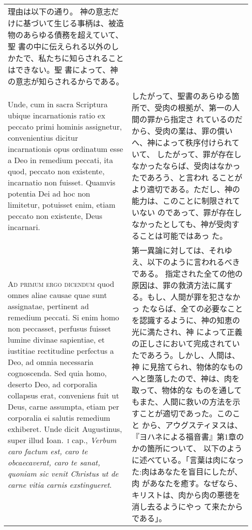 \documentclass[10pt]{jsarticle} %
\begin{document}
\begin{longtable}{p{21em}p{21em}}
理由は以下の通り。
神の意志だけに基づいて生じる事柄は、被造物のあらゆる債務を超えていて、聖
 書の中に伝えられる以外のしかたで、私たちに知らされることはできない。聖
 書によって、神の意志が知らされるからである。


\\

Unde, cum in sacra Scriptura ubique
incarnationis ratio ex peccato primi hominis assignetur, convenientius
dicitur incarnationis opus ordinatum esse a Deo in remedium peccati, ita
quod, peccato non existente, incarnatio non fuisset. Quamvis potentia
Dei ad hoc non limitetur, potuisset enim, etiam peccato non existente,
Deus incarnari.


&

したがって、聖書のあらゆる箇所で、受肉の根拠が、第一の人間の罪から指定さ
 れているのだから、受肉の業は、罪の償いへ、神によって秩序付けられていて、
 したがって、罪が存在しなかったならば、受肉はなかったであろう、と言われ
 ることがより適切である。ただし、神の能力は、このことに制限されていない
 のであって、罪が存在しなかったとしても、神が受肉することは可能ではあっ
 た。


\\


{\scshape Ad primum ergo dicendum} quod omnes aliae
causae quae sunt assignatae, pertinent ad remedium peccati. Si enim homo
non peccasset, perfusus fuisset lumine divinae sapientiae, et iustitiae
rectitudine perfectus a Deo, ad omnia necessaria cognoscenda. Sed quia
homo, deserto Deo, ad corporalia collapsus erat, conveniens fuit ut
Deus, carne assumpta, etiam per corporalia ei salutis remedium
exhiberet. Unde dicit Augustinus, super illud Ioan.~{\scshape i} cap., {\itshape Verbum caro
factum est, caro te obcaecaverat, caro te sanat, quoniam sic venit
Christus ut de carne vitia carnis exstingueret}.


&

第一異論に対しては、それゆえ、以下のように言われるべきである。
指定された全ての他の原因は、罪の救済方法に属する。もし、人間が罪を犯さなかっ
 たならば、全ての必要なことを認識するように、神の知恵の光に満たされ、神
 によって正義の正しさにおいて完成されていたであろう。しかし、人間は、神
 に見捨てられ、物体的なものへと堕落したので、神は、肉を取って、物体的な
 ものを通してもまた、人間に救いの方法を示すことが適切であった。このこと
 から、アウグスティヌスは、『ヨハネによる福音書』第1章のかの箇所について、
 以下のように述べている。「言葉は肉になった:肉はあなたを盲目にしたが、肉
 があなたを癒す。なぜなら、キリストは、肉から肉の悪徳を消し去るようにやっ
 て来たからである」。



\end{longtable}
\end{document}

